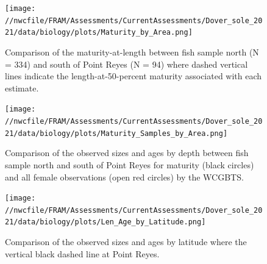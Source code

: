 \documentclass[11pt,
  english,
  a4paper,
]{article}
\begin{document}
\tagmcend\tagstructend


\begin{figure}
\centering
\texttt{[image: //nwcfile/FRAM/Assessments/CurrentAssessments/Dover\_sole\_2021/data/biology/plots/Maturity\_by\_Area.png]}
\caption{Comparison of the maturity-at-length between fish sample north (N = 334) and south of Point Reyes (N = 94) where dashed vertical lines indicate the length-at-50-percent maturity associated with each estimate.\label{fig:spat-mat-at-len}}
\end{figure}

\tagmcend\tagstructend


\begin{figure}
\centering
\texttt{[image: //nwcfile/FRAM/Assessments/CurrentAssessments/Dover\_sole\_2021/data/biology/plots/Maturity\_Samples\_by\_Area.png]}
\caption{Comparison of the observed sizes and ages by depth between fish sample north and south of Point Reyes for maturity (black circles) and all female observations (open red circles) by the WCGBTS.\label{fig:samples-north-south}}
\end{figure}

\tagmcend\tagstructend


\begin{figure}
\centering
\texttt{[image: //nwcfile/FRAM/Assessments/CurrentAssessments/Dover\_sole\_2021/data/biology/plots/Len\_Age\_by\_Latitude.png]}
\caption{Comparison of the observed sizes and ages by latitude where the vertical black dashed line at Point Reyes.\label{fig:fish-by-lat}}
\end{figure}

\tagmcend\tagstructend

\end{document}
